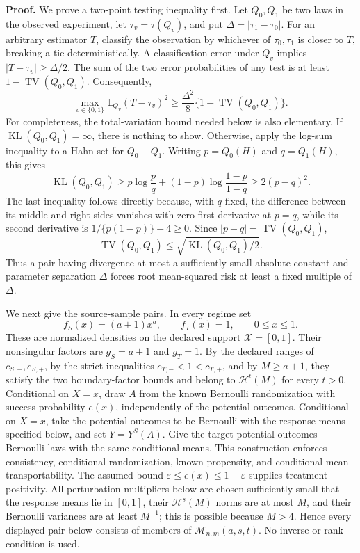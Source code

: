 \textbf{Proof.}
We prove a two-point testing inequality first.  Let \(Q_0,Q_1\) be two laws in the observed experiment, let \(\tau_v=\tau(Q_v)\), and put \(\Delta=|\tau_1-\tau_0|\).  For an arbitrary estimator \(T\), classify the observation by whichever of \(\tau_0,\tau_1\) is closer to \(T\), breaking a tie deterministically.  A classification error under \(Q_v\) implies \(|T-\tau_v|\geq \Delta/2\).  The sum of the two error probabilities of any test is at least \(1-\operatorname{TV}(Q_0,Q_1)\).  Consequently,
\[
 \max_{v\in\{0,1\}}\mathbb E_{Q_v}(T-\tau_v)^2
 \geq \frac{\Delta^2}{8}\{1-\operatorname{TV}(Q_0,Q_1)\}.
 \tag{14}
\]
For completeness, the total-variation bound needed below is also elementary.  If \(\operatorname{KL}(Q_0,Q_1)=\infty\), there is nothing to show.  Otherwise, apply the log-sum inequality to a Hahn set for \(Q_0-Q_1\).  Writing \(p=Q_0(H)\) and \(q=Q_1(H)\), this gives
\[
 \operatorname{KL}(Q_0,Q_1)
 \geq p\log\frac pq+(1-p)\log\frac{1-p}{1-q}
 \geq 2(p-q)^2.
 \tag{15}
\]
The last inequality follows directly because, with \(q\) fixed, the difference between its middle and right sides vanishes with zero first derivative at \(p=q\), while its second derivative is \(1/\{p(1-p)\}-4\geq0\).  Since \(|p-q|=\operatorname{TV}(Q_0,Q_1)\),
\[
 \operatorname{TV}(Q_0,Q_1)
 \leq \sqrt{\operatorname{KL}(Q_0,Q_1)/2}.
 \tag{16}
\]
Thus a pair having divergence at most a sufficiently small absolute constant and parameter separation \(\Delta\) forces root mean-squared risk at least a fixed multiple of \(\Delta\).

We next give the source-sample pairs.  In every regime set
\[
 f_S(x)=(a+1)x^a,
 \qquad
 f_T(x)=1,
 \qquad 0\leq x\leq1.
 \tag{17}
\]
These are normalized densities on the declared support \(\mathcal X=[0,1]\).  Their nonsingular factors are \(g_S=a+1\) and \(g_T=1\).  By the declared ranges of \(c_{S,-},c_{S,+}\), by the strict inequalities \(c_{T,-}<1<c_{T,+}\), and by \(M\geq a+1\), they satisfy the two boundary-factor bounds and belong to \(\mathcal H^t(M)\) for every \(t>0\).  Conditional on \(X=x\), draw \(A\) from the known Bernoulli randomization with success probability \(e(x)\), independently of the potential outcomes.  Conditional on \(X=x\), take the potential outcomes to be Bernoulli with the response means specified below, and set \(Y=Y^S(A)\).  Give the target potential outcomes Bernoulli laws with the same conditional means.  This construction enforces consistency, conditional randomization, known propensity, and conditional mean transportability.  The assumed bound \(\varepsilon\leq e(x)\leq1-\varepsilon\) supplies treatment positivity.  All perturbation multipliers below are chosen sufficiently small that the response means lie in \([0,1]\), their \(\mathcal H^s(M)\) norms are at most \(M\), and their Bernoulli variances are at least \(M^{-1}\); this is possible because \(M>4\).  Hence every displayed pair below consists of members of \(\mathcal M_{n,m}(a,s,t)\).  No inverse or rank condition is used.

